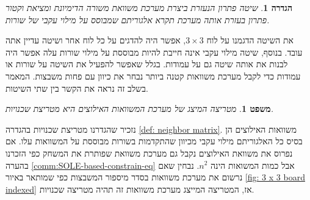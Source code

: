 \documentclass[12pt,leqno]{article}
\theoremstyle{theoremdd}
\newtheorem{definition}{הגדרה}[section]
\newtheorem{theorem}{משפט}[section]
\begin{document}
\begin{definition}
    \label{def: spanish way}
    שיטה פתרון הנעזרת ביצרת מערכת משוואת משורה הדימיונת
    ומציאת וקטור פתרון
    בעזרת אותה מערכת
    תקרא 
    אלגוריתם שמבוסס על מילוי עקבי של שורות.
\end{definition}
את השיטה הדגמנו על לוח 
$3 \times 3$,
אפשר היה להדגים על כל לוח אחר ושיטה עדיין אתה עובד.
בנוסף, שיטה 
מילוי עקבי אינה חייבת להיות מבוססת על מילוי שורות עלה 
אפשר היה לבנות את אותה שיטה גם על עמודות.
בגלל שאפשר להפעיל את השיטה על שורות או עמודות 
כדי לקבל מערכת משוואות קטנה ביותר נבחר 
את כיוון עם פחות משבצות.
המאמר 
בשלב זה נראה את הקשר בין שתי השיטות.
\begin{theorem}
    מטריצה המיצג של מערכת המשוואות האילוצים היא מטריצת שכנויות.
\end{theorem}
נזכיר שהגדרנו מטריצת שכנויות בהגדרה
\ref{def: neighbor matrix}.
משוואות האילוצים הן בסיס כל האלגוריתם מילוי עקבי
מכיוון שהתקדמות בשורות מבוססת על המשוואות עלו.
אם נפרוס את משוואת האילוצים נקבל גם מערכת משוואת שפותרת את המשחק
כפי הזכרנו בהערה 
\ref{comm:SOLE-based-constrain-eq}
אבל כמות המשואות הינה 
$n^2$.
נבחין שאם נרשום את 
מערכת 
משוואות בסדר 
מיספור המשבצות
כפי שמותאר באיור 
\ref{fig: 3 x 3 board indexed}
אז,
המטריצה המייצג מערכת משוואות זה תהיה 
מטריצה שכנויות.
\end{document}

